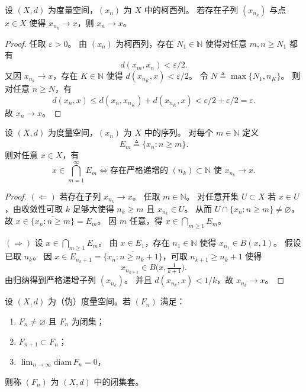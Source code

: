 \documentclass[lang=cn,a4paper,newtx,section]{elegantbook}
\begin{document}
\begin{proposition}\label{prop:cauchy-subsequence-limit}
  设 $(X,d)$ 为度量空间，$(x_n)$ 为 $X$ 中的柯西列。
  若存在子列 $(x_{n_k})$ 与点 $x\in X$ 使得 $x_{n_k}\to x$，则 $x_n\to x$。
\end{proposition}

\begin{proof}
  任取 $\varepsilon>0$。
  由 $(x_n)$ 为柯西列，存在 $N_1\in\mathbb{N}$ 使得对任意 $m,n\ge N_1$ 都有
  \[
    d(x_m,x_n)<\varepsilon/2.
  \]
  又因 $x_{n_k}\to x$，存在 $K\in\mathbb{N}$ 使得 $d(x_{n_K},x)<\varepsilon/2$。
  令 $N\triangleq\max\{N_1,n_K\}$。
  则对任意 $n\ge N$，有
  \[
    d(x_n,x)\le d(x_n,x_{n_K})+d(x_{n_K},x)<\varepsilon/2+\varepsilon/2=\varepsilon.
  \]
  故 $x_n\to x$。
\end{proof}

\begin{proposition}\label{prop:cluster-points-tail-closures}
  设 $(X,d)$ 为度量空间，$(x_n)$ 为 $X$ 中的序列。
  对每个 $m\in\mathbb{N}$ 定义
  \[
    E_m\triangleq \overline{\{x_n: n\ge m\}}.
  \]
  则对任意 $x\in X$，有
  \[
    x\in\bigcap_{m=1}^{\infty}E_m
    \iff \text{存在严格递增的 }(n_k)\subset\mathbb{N}\text{ 使 }x_{n_k}\to x.
  \]
\end{proposition}

\begin{proof}
  $(\Leftarrow)$ 若存在子列 $x_{n_k}\to x$。
  任取 $m\in\mathbb{N}$。
  对任意开集 $U\subset X$ 若 $x\in U$，由收敛性可取 $k$ 足够大使得 $n_k\ge m$ 且 $x_{n_k}\in U$。
  从而 $U\cap\{x_n:n\ge m\}\ne\varnothing$，故 $x\in\overline{\{x_n:n\ge m\}}=E_m$。
  因 $m$ 任意，得 $x\in\bigcap_{m\ge1}E_m$。

  $(\Rightarrow)$ 设 $x\in\bigcap_{m\ge1}E_m$。
  由 $x\in E_1$，存在 $n_1\in\mathbb{N}$ 使得 $x_{n_1}\in B(x,1)$。
  假设已取 $n_k$。
  因 $x\in E_{n_k+1}=\overline{\{x_n:n\ge n_k+1\}}$，可取 $n_{k+1}\ge n_k+1$ 使得
  \[
    x_{n_{k+1}}\in B\bigl(x,\tfrac{1}{k+1}\bigr).
  \]
  由归纳得到严格递增子列 $(x_{n_k})$。
  并且 $d(x_{n_k},x)<1/k$，故 $x_{n_k}\to x$。
\end{proof}



\begin{definition}
  设 $(X,d)$ 为（伪）度量空间。若 $(F_n)$ 满足：
  \begin{enumerate}
    \item $F_n\ne\varnothing$ 且 $F_n$ 为闭集；
    \item $F_{n+1}\subset F_n$；
    \item $\lim_{n\to\infty}\mathrm{diam}\,F_n=0$，
  \end{enumerate}
  则称 $(F_n)$ 为 $(X,d)$ 中的闭集套。
\end{definition}
\end{document}
